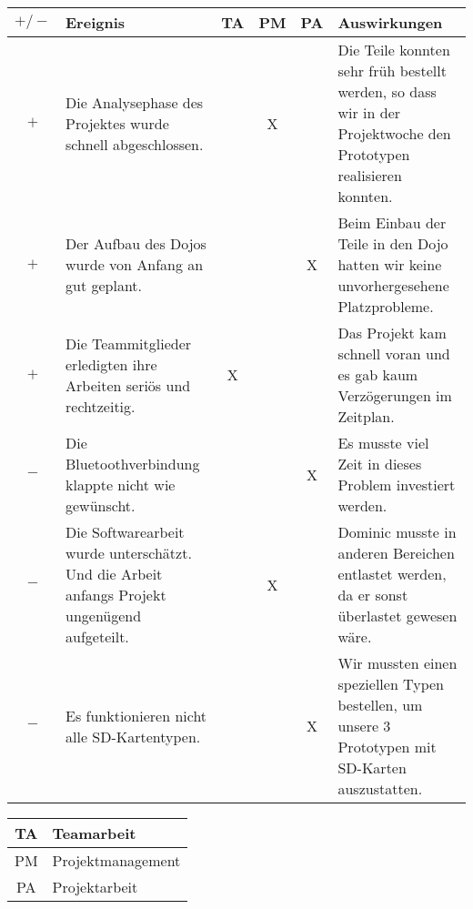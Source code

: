 \begin{center}
    \begin{tabular}{ | c | m{5.5cm} | c | c | c | m{5.5cm} |}
    \hline
    $+/-$ & Ereignis & TA & PM & PA & Auswirkungen \\ \hline
    
$+$ & Die Analysephase des Projektes wurde schnell abgeschlossen. & & X & & Die Teile konnten sehr früh bestellt werden, so dass wir in der Projektwoche den Prototypen realisieren konnten. \\ \hline
    
$+$ & Der Aufbau des Dojos wurde von Anfang an gut geplant. & & & X & Beim Einbau der Teile in den Dojo hatten wir keine unvorhergesehene Platzprobleme. \\ \hline
    
$+$ & Die Teammitglieder erledigten ihre Arbeiten seriös und rechtzeitig. & X &  & & Das Projekt kam schnell voran und es gab kaum Verzögerungen im Zeitplan. \\ \hline
    
$-$ & Die Bluetoothverbindung klappte nicht wie gewünscht. & &  & X & Es musste viel Zeit in dieses Problem investiert werden.  \\ \hline
    
$-$ & Die Softwarearbeit wurde unterschätzt. Und die Arbeit anfangs Projekt ungenügend aufgeteilt. & & X & & Dominic musste in anderen Bereichen entlastet werden, da er sonst überlastet gewesen wäre.  \\ \hline
    
$-$ & Es funktionieren nicht alle SD-Kartentypen. & & & X & Wir mussten einen speziellen Typen bestellen, um unsere 3 Prototypen mit SD-Karten auszustatten.  \\ \hline

    \end{tabular}
\end{center}

\begin{tabular}{ | c | l | }
    \hline
    TA & Teamarbeit \\ \hline
    PM & Projektmanagement \\ \hline
    PA & Projektarbeit \\ \hline
   
    \end{tabular}
    
    